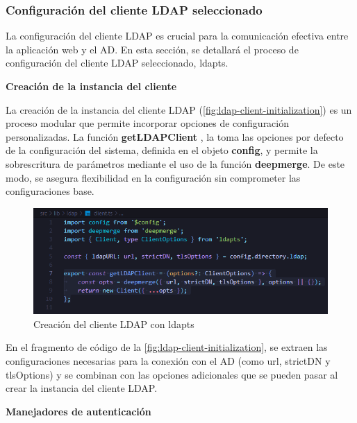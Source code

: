 \subsubsection{Configuración del cliente LDAP seleccionado}

La configuración del cliente LDAP es crucial para la comunicación efectiva entre la aplicación web y el AD. En esta sección, se detallará el proceso de configuración del cliente LDAP seleccionado, ldapts.

\textbf{Creación de la instancia del cliente}

La creación de la instancia del cliente LDAP (\autoref{fig:ldap-client-initialization}) es un proceso modular que permite incorporar opciones de configuración personalizadas. La función \textbf{getLDAPClient} , la toma las opciones por defecto de la configuración del sistema, definida en el objeto \textbf{config}, y permite la sobrescritura de parámetros mediante el uso de la función \textbf{deepmerge}. De este modo, se asegura flexibilidad en la configuración sin comprometer las configuraciones base.

\begin{figure}[H]
    \centering
    \includegraphics[width=\linewidth]{images/code/ldap-client-initialization.png}
    \caption{Creación del cliente LDAP con ldapts}
    \label{fig:ldap-client-initialization}
\end{figure}

En el fragmento de código de la \autoref{fig:ldap-client-initialization}, se extraen las configuraciones necesarias para la conexión con el AD (como url, strictDN y tlsOptions) y se combinan con las opciones adicionales que se pueden pasar al crear la instancia del cliente LDAP.

\textbf{Manejadores de autenticación}

